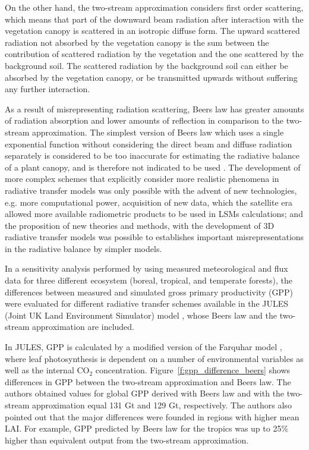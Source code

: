 On the other hand, the two-stream approximation considers first order scattering, which means that part of the downward beam radiation after interaction with the vegetation canopy is scattered in an isotropic diffuse form. The upward scattered radiation not absorbed by the vegetation canopy is the sum between the contribution of scattered radiation by the vegetation and the one scattered by the background soil. The scattered radiation by the background soil can either be absorbed by the vegetation canopy, or be transmitted upwards without suffering any further interaction. 

As a result of misrepresenting radiation scattering, Beer\textquotesingle s law has greater amounts of radiation absorption and lower amounts of reflection in comparison to the two-stream approximation. The simplest version of Beer\textquotesingle s law which uses a single exponential function without considering the direct beam and diffuse radiation separately is considered to be too inaccurate for estimating the radiative balance of a plant canopy, and is therefore not indicated to be used \citep{Wang1990a}. 
The development of more complex schemes that explicitly consider more realistic phenomena in radiative transfer models was only possible with the advent of new technologies, e.g. more computational power, acquisition of new data, which the satellite era allowed more available radiometric products to be used in LSMs calculations; and the proposition of new theories and methods, with the development of 3D radiative transfer models \citep{Wang1990} was possible to establishes important misrepresentations in the radiative balance by simpler models. 

In a sensitivity analysis performed by \citet{Alton2007} using measured meteorological and flux data for three different ecosystem (boreal, tropical, and temperate forests), the differences between measured and simulated gross primary productivity (GPP) were evaluated for different radiative transfer schemes available in the JULES (Joint UK Land Environment Simulator) model \citep{Best2011,Clark2011}, whose Beer\textquotesingle s law and the two-stream approximation are included. 

In JULES, GPP is calculated by a modified version of the Farquhar model \citep{Farquhar1980,Collatz1991,Collatz1992}, where leaf photosynthesis is dependent on a number of environmental variables as well as the internal CO$_2$ concentration. Figure~\ref{f:gpp_difference_beers} shows differences in GPP between the two-stream approximation and Beer\textquotesingle s law. The authors obtained values for global GPP derived with Beer\textquotesingle s law and with the two-stream approximation equal 131 Gt and 129 Gt, respectively. The authors also pointed out that the major differences were founded in regions with higher mean LAI. For example, GPP predicted by Beer\textquotesingle s law for the tropics was up to 25\% higher than equivalent output from the two-stream approximation. 

